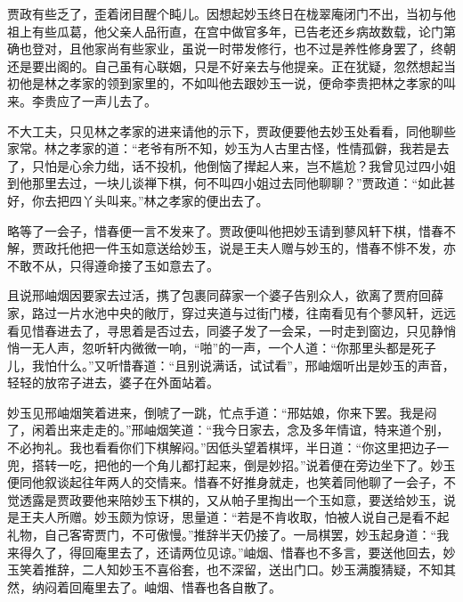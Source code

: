 \documentclass[12pt,oneside]{book}
\begin{document}
贾政有些乏了，歪着闭目醒个盹儿。因想起妙玉终日在栊翠庵闭门不出，当初与他祖上有些瓜葛，他父亲人品衎直，在宫中做官多年，已告老还乡病故数载，论门第确也登对，且他家尚有些家业，虽说一时带发修行，也不过是养性修身罢了，终朝还是要出阁的。自己虽有心联姻，只是不好亲去与他提亲。正在犹疑，忽然想起当初他是林之孝家的领到家里的，不如叫他去跟妙玉一说，便命李贵把林之孝家的叫来。李贵应了一声儿去了。

不大工夫，只见林之孝家的进来请他的示下，贾政便要他去妙玉处看看，同他聊些家常。林之孝家的道：“老爷有所不知，妙玉为人古里古怪，性情孤僻，我若是去了，只怕是心余力绌，话不投机，他倒恼了撵起人来，岂不尴尬？我曾见过四小姐到他那里去过，一块儿谈禅下棋，何不叫四小姐过去同他聊聊？”贾政道：“如此甚好，你去把四丫头叫来。”林之孝家的便出去了。

略等了一会子，惜春便一言不发来了。贾政便叫他把妙玉请到蓼风轩下棋，惜春不解，贾政托他把一件玉如意送给妙玉，说是王夫人赠与妙玉的，惜春不悱不发，亦不敢不从，只得遵命接了玉如意去了。

且说邢岫烟因要家去过活，携了包裹同薛家一个婆子告别众人，欲离了贾府回薛家，路过一片水池中央的敞厅，穿过夹道与过街门楼，往南看见有个蓼风轩，远远看见惜春进去了，寻思着是否过去，同婆子发了一会呆，一时走到窗边，只见静悄悄一无人声，忽听轩内微微一响，“啪”的一声，一个人道：“你那里头都是死子儿，我怕什么。”又听惜春道：“且别说满话，试试看”，邢岫烟听出是妙玉的声音，轻轻的放帘子进去，婆子在外面站着。

妙玉见邢岫烟笑着进来，倒唬了一跳，忙点手道：“邢姑娘，你来下罢。我是闷了，闲着出来走走的。”邢岫烟笑道：“我今日家去，念及多年情谊，特来道个别，不必拘礼。我也看看你们下棋解闷。”因低头望着棋坪，半日道：“你这里把边子一兜，搭转一吃，把他的一个角儿都打起来，倒是妙招。”说着便在旁边坐下了。妙玉便同他叙谈起往年两人的交情来。惜春不好推身就走，也笑着同他聊了一会子，不觉透露是贾政要他来陪妙玉下棋的，又从帕子里掏出一个玉如意，要送给妙玉，说是王夫人所赠。妙玉颇为惊讶，思量道：“若是不肯收取，怕被人说自己是看不起礼物，自己客寄贾门，不可傲慢。”推辞半天仍接了。一局棋罢，妙玉起身道：“我来得久了，得回庵里去了，还请两位见谅。”岫烟、惜春也不多言，要送他回去，妙玉笑着推辞，二人知妙玉不喜俗套，也不深留，送出门口。妙玉满腹猜疑，不知其然，纳闷着回庵里去了。岫烟、惜春也各自散了。
\end{document}

